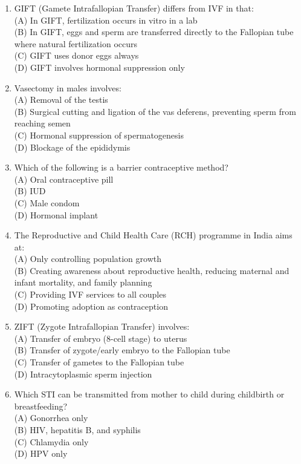 \documentclass{article}
\begin{document}
\begin{enumerate}[label=Q\arabic*.]
\item GIFT (Gamete Intrafallopian Transfer) differs from IVF in that:
\\(A) In GIFT, fertilization occurs in vitro in a lab
\\(B) In GIFT, eggs and sperm are transferred directly to the Fallopian tube where natural fertilization occurs
\\(C) GIFT uses donor eggs always
\\(D) GIFT involves hormonal suppression only

\item Vasectomy in males involves:
\\(A) Removal of the testis
\\(B) Surgical cutting and ligation of the vas deferens, preventing sperm from reaching semen
\\(C) Hormonal suppression of spermatogenesis
\\(D) Blockage of the epididymis

\item Which of the following is a barrier contraceptive method?
\\(A) Oral contraceptive pill
\\(B) IUD
\\(C) Male condom
\\(D) Hormonal implant

\item The Reproductive and Child Health Care (RCH) programme in India aims at:
\\(A) Only controlling population growth
\\(B) Creating awareness about reproductive health, reducing maternal and infant mortality, and family planning
\\(C) Providing IVF services to all couples
\\(D) Promoting adoption as contraception

\item ZIFT (Zygote Intrafallopian Transfer) involves:
\\(A) Transfer of embryo (8-cell stage) to uterus
\\(B) Transfer of zygote/early embryo to the Fallopian tube
\\(C) Transfer of gametes to the Fallopian tube
\\(D) Intracytoplasmic sperm injection

\item Which STI can be transmitted from mother to child during childbirth or breastfeeding?
\\(A) Gonorrhea only
\\(B) HIV, hepatitis B, and syphilis
\\(C) Chlamydia only
\\(D) HPV only


\end{enumerate}
\end{document}
